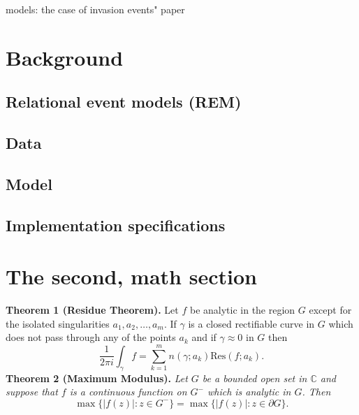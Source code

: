 \documentclass[mscthesis]{usiinfthesis}
\begin{document}
models: the case of invasion events" paper




\section{Background}
\subsection{Relational event models (REM)}

\subsection{Data}


\subsection{Model}

\subsection{Implementation specifications}


\section{The second, math section}

\textbf{Theorem 1 (Residue Theorem).}
Let $f$ be analytic in the region $G$ except for the isolated singularities $a_1,a_2,\ldots,a_m$. If $\gamma$ is a closed rectifiable curve in $G$ which does not pass through any of the points $a_k$ and if $\gamma\approx 0$ in $G$ then
\[
\frac{1}{2\pi i}\int_\gamma f = \sum_{k=1}^m n(\gamma;a_k) \text{Res}(f;a_k).
\]
\textbf{Theorem 2 (Maximum Modulus).}
\emph{Let $G$ be a bounded open set in $\mathbb{C}$ and suppose that $f$ is a continuous function on $G^-$ which is analytic in $G$. Then}
\[
\max\{|f(z)|:z\in G^-\}=\max \{|f(z)|:z\in \partial G \}.
\]
\end{document}

